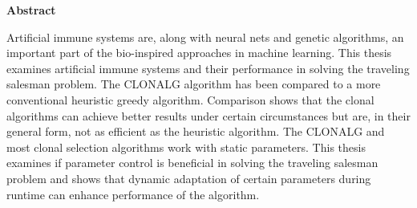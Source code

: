 %
%
% 
% 
% 



\cleardoublepage


\begin{center}
{\Large\bfseries Abstract}
\end{center}
Artificial immune systems are, along with neural nets and genetic algorithms, an important part of the bio-inspired approaches in machine learning. This thesis examines artificial immune systems and their performance in solving the traveling salesman problem. The CLONALG algorithm has been compared to a more conventional heuristic greedy algorithm. Comparison shows that the clonal algorithms can achieve better results under certain circumstances but are, in their general form, not as efficient as the heuristic algorithm. The CLONALG and most clonal selection algorithms work with static parameters. This thesis examines if parameter control is beneficial in solving the traveling salesman problem and shows that dynamic adaptation of certain parameters during runtime can enhance performance of the algorithm. 

